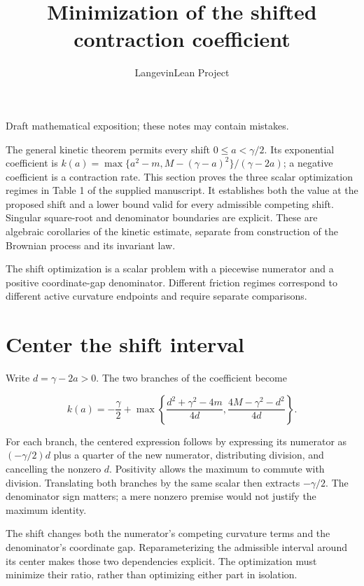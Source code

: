 \documentclass[11pt,a4paper]{article}
\title{\texorpdfstring{Minimization of the shifted contraction coefficient}{Minimization of the shifted contraction coefficient}}
\author{LangevinLean Project}
\date{}
\begin{document}
\maketitle
Draft mathematical exposition; these notes may contain mistakes.


The general kinetic theorem permits every shift \(0\le a<\gamma/2\). Its exponential coefficient is \(k(a)=\max\{a^2-m,M-(\gamma-a)^2\}/(\gamma-2a)\); a negative coefficient is a contraction rate. This section proves the three scalar optimization regimes in Table 1 of the supplied manuscript. It establishes both the value at the proposed shift and a lower bound valid for every admissible competing shift. Singular square-root and denominator boundaries are explicit. These are algebraic corollaries of the kinetic estimate, separate from construction of the Brownian process and its invariant law.



The shift optimization is a scalar problem with a piecewise numerator and a positive coordinate-gap denominator. Different friction regimes correspond to different active curvature endpoints and require separate comparisons.


\section{\texorpdfstring{Center the shift interval}{Center the shift interval}}


Write \(d=\gamma-2a>0\). The two branches of the coefficient become

\[k(a)=-\frac\gamma2+\max\left\{\frac{d^2+\gamma^2-4m}{4d},\frac{4M-\gamma^2-d^2}{4d}\right\}.\]

For each branch, the centered expression follows by expressing its numerator as \((-\gamma/2)d\) plus a quarter of the new numerator, distributing division, and cancelling the nonzero \(d\). Positivity allows the maximum to commute with division. Translating both branches by the same scalar then extracts \(-\gamma/2\). The denominator sign matters; a mere nonzero premise would not justify the maximum identity.



The shift changes both the numerator’s competing curvature terms and the denominator’s coordinate gap. Reparameterizing the admissible interval around its center makes those two dependencies explicit. The optimization must minimize their ratio, rather than optimizing either part in isolation.
\end{document}
